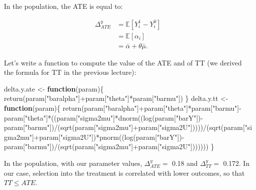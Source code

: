 \documentclass[
]{book}
\newenvironment{Shaded}{\begin{snugshade}}{\end{snugshade}}
\newcommand{\ControlFlowTok}[1]{\textcolor[rgb]{0.13,0.29,0.53}{\textbf{#1}}}
\newcommand{\FunctionTok}[1]{\textcolor[rgb]{0.00,0.00,0.00}{#1}}
\newcommand{\NormalTok}[1]{#1}
\newcommand{\OtherTok}[1]{\textcolor[rgb]{0.56,0.35,0.01}{#1}}
\newcommand{\SpecialCharTok}[1]{\textcolor[rgb]{0.00,0.00,0.00}{#1}}
\newcommand{\StringTok}[1]{\textcolor[rgb]{0.31,0.60,0.02}{#1}}
\newcommand{\esp}[1]{\mathbb{E}[ #1 ]}
\theoremstyle{definition}
\theoremstyle{definition}
\theoremstyle{definition}
\theoremstyle{definition}
\theoremstyle{remark}
\begin{document}
In the population, the ATE is equal to:

\begin{align*}
\Delta^y_{ATE} & = \esp{Y_i^1-Y_i^0} \\
              & = \esp{\alpha_i} \\
              & = \bar{\alpha}+\theta\bar{\mu}.
\end{align*}

Let's write a function to compute the value of the ATE and of TT (we derived the formula for TT in the previous lecture):

\begin{Shaded}
\begin{Highlighting}[]
\NormalTok{delta.y.ate }\OtherTok{\textless{}{-}} \ControlFlowTok{function}\NormalTok{(param)\{}
  \FunctionTok{return}\NormalTok{(param[}\StringTok{"baralpha"}\NormalTok{]}\SpecialCharTok{+}\NormalTok{param[}\StringTok{"theta"}\NormalTok{]}\SpecialCharTok{*}\NormalTok{param[}\StringTok{"barmu"}\NormalTok{])}
\NormalTok{\}}
\NormalTok{delta.y.tt }\OtherTok{\textless{}{-}} \ControlFlowTok{function}\NormalTok{(param)\{}
  \FunctionTok{return}\NormalTok{(param[}\StringTok{"baralpha"}\NormalTok{]}\SpecialCharTok{+}\NormalTok{param[}\StringTok{"theta"}\NormalTok{]}\SpecialCharTok{*}\NormalTok{param[}\StringTok{"barmu"}\NormalTok{]}\SpecialCharTok{{-}}\NormalTok{param[}\StringTok{"theta"}\NormalTok{]}\SpecialCharTok{*}\NormalTok{((param[}\StringTok{"sigma2mu"}\NormalTok{]}\SpecialCharTok{*}\FunctionTok{dnorm}\NormalTok{((}\FunctionTok{log}\NormalTok{(param[}\StringTok{"barY"}\NormalTok{])}\SpecialCharTok{{-}}\NormalTok{param[}\StringTok{"barmu"}\NormalTok{])}\SpecialCharTok{/}\NormalTok{(}\FunctionTok{sqrt}\NormalTok{(param[}\StringTok{"sigma2mu"}\NormalTok{]}\SpecialCharTok{+}\NormalTok{param[}\StringTok{"sigma2U"}\NormalTok{]))))}\SpecialCharTok{/}\NormalTok{(}\FunctionTok{sqrt}\NormalTok{(param[}\StringTok{"sigma2mu"}\NormalTok{]}\SpecialCharTok{+}\NormalTok{param[}\StringTok{"sigma2U"}\NormalTok{])}\SpecialCharTok{*}\FunctionTok{pnorm}\NormalTok{((}\FunctionTok{log}\NormalTok{(param[}\StringTok{"barY"}\NormalTok{])}\SpecialCharTok{{-}}\NormalTok{param[}\StringTok{"barmu"}\NormalTok{])}\SpecialCharTok{/}\NormalTok{(}\FunctionTok{sqrt}\NormalTok{(param[}\StringTok{"sigma2mu"}\NormalTok{]}\SpecialCharTok{+}\NormalTok{param[}\StringTok{"sigma2U"}\NormalTok{]))))))}
\NormalTok{\}}
\end{Highlighting}
\end{Shaded}

In the population, with our parameter values, \(\Delta^y_{ATE}=\) 0.18 and \(\Delta^y_{TT}=\) 0.172.
In our case, selection into the treatment is correlated with lower outcomes, so that \(TT\leq ATE\).
\end{document}
